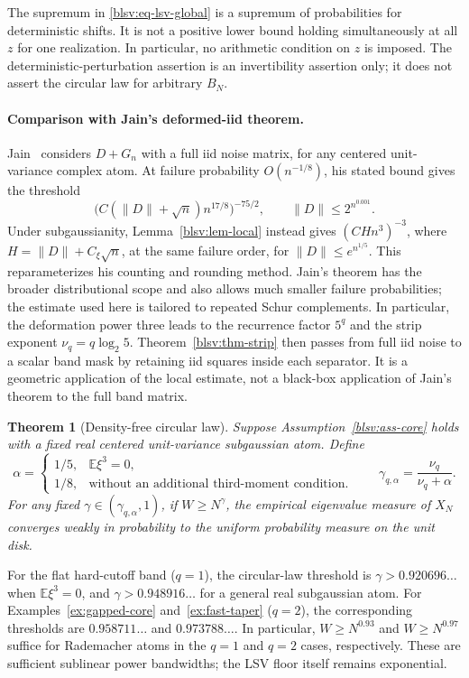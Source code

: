 \documentclass[11pt,reqno]{amsart}
\numberwithin{equation}{section}
\theoremstyle{plain}
\newtheorem{theorem}{Theorem}[section]
\theoremstyle{definition}
\theoremstyle{remark}
\providecommand{\blsvE}{\mathbb E}
\begin{document}
The supremum in \eqref{blsv:eq-lsv-global} is a supremum of probabilities
for deterministic shifts. It is not a positive lower bound holding
simultaneously at all $z$ for one realization. In particular, no
arithmetic condition on $z$ is imposed. The deterministic-perturbation
assertion is an invertibility assertion only; it does not assert the
circular law for arbitrary $B_N$.

\paragraph{Comparison with Jain's deformed-iid theorem.}
Jain~\cite[Theorem~1.1]{blsvJain} considers $D+G_n$ with a full iid
noise matrix, for any centered unit-variance complex atom. At failure
probability $O(n^{-1/8})$, his stated bound gives the threshold
\[
 \bigl(C(\|D\|+\sqrt n)n^{17/8}\bigr)^{-75/2},
 \qquad \|D\|\le2^{n^{0.001}}.
\]
Under subgaussianity, Lemma~\ref{blsv:lem-local} instead gives
$(CHn^3)^{-3}$, where $H=\|D\|+C_\xi\sqrt n$, at the same failure
order, for $\|D\|\le e^{n^{1/5}}$. This reparameterizes his counting
and rounding method. Jain's theorem has the broader distributional
scope and also allows much smaller failure probabilities; the estimate
used here is tailored to repeated Schur complements. In particular,
the deformation power three leads to the recurrence factor $5^q$ and
the strip exponent $\nu_q=q\log_2 5$.
Theorem~\ref{blsv:thm-strip} then passes from full iid noise to a
scalar band mask by retaining iid squares inside each separator.
It is a geometric application of the local estimate, not a black-box
application of Jain's theorem to the full band matrix.

\begin{theorem}[Density-free circular law]\label{blsv:thm-circle}
Suppose Assumption~\ref{blsv:ass-core} holds with a fixed real centered
unit-variance subgaussian atom. Define
\[
 \alpha=\begin{cases}
  1/5,&\blsvE\xi^3=0,\\
  1/8,&\text{without an additional third-moment condition}.
 \end{cases}
 \qquad \gamma_{q,\alpha}=\frac{\nu_q}{\nu_q+\alpha}.
\]
For any fixed $\gamma\in(\gamma_{q,\alpha},1)$, if $W\ge N^\gamma$,
the empirical eigenvalue measure of $X_N$ converges weakly in probability
to the uniform probability measure on the unit disk.
\end{theorem}


For the flat hard-cutoff band ($q=1$), the circular-law threshold is
$\gamma>0.920696\ldots$ when $\mathbb E\xi^3=0$, and
$\gamma>0.948916\ldots$ for a general real subgaussian atom.
For Examples~\ref{ex:gapped-core} and~\ref{ex:fast-taper} ($q=2$),
the corresponding thresholds are $0.958711\ldots$ and
$0.973788\ldots$. In particular, $W\ge N^{0.93}$ and $W\ge N^{0.97}$
suffice for Rademacher atoms in the $q=1$ and $q=2$ cases, respectively.
These are sufficient sublinear power bandwidths; the LSV floor itself
remains exponential.
\end{document}
